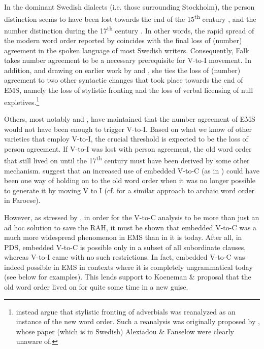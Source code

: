 \documentclass[output=paper]{langscibook}
\begin{document}
In the dominant Swedish dialects (i.e. those surrounding Stockholm), the person distinction seems to have been lost towards the end of the 15\textsuperscript{th} century \citep{Neuman1925}, and the number distinction during the 17\textsuperscript{th} century \citep{Larsson1988}. In other words, the rapid spread of the modern word order reported by \citet{Falk1993} coincides with the final loss of (number) agreement in the spoken language of most Swedish writers. Consequently, Falk takes number agreement to be a necessary prerequisite for V-to-I movement. In addition, and drawing on earlier work by \citet{Platzack1985} and \citet{PlatzackHolmberg1989}, she ties the loss of (number) agreement to two other syntactic changes that took place towards the end of EMS, namely the loss of stylistic fronting and the loss of verbal licensing of null expletives.\footnote{\citet{AlexiadouFanselow2002} instead argue that stylistic fronting of adverbials was reanalyzed as an instance of the new word order. Such a reanalysis was originally proposed by \citet{Pettersson1988}, whose paper (which is in Swedish) Alexiadou \& Fanselow were clearly unaware of.} 



Others, most notably \citet{Rohrbacher1999} and \citet{KoenemanZeijlstra2014}, have maintained that the number agreement of EMS would not have been enough to trigger V-to-I. Based on what we know of other varieties that employ V-to-I, the crucial threshold is expected to be the loss of person agreement. If V-to-I was lost with person agreement, the old word order that still lived on until the 17\textsuperscript{th} century must have been derived by some other mechanism. \citet{KoenemanZeijlstra2014} suggest that an increased use of embedded V-to-C (as in ) could have been one way of holding on to the old word order when it was no longer possible to generate it by moving V to I (cf. \citealt{HeycockEtAl2010} for a similar approach to archaic word order in Faroese).



However, as stressed by \citet{Gartner2019}, in order for the V-to-C analysis to be more than just an ad hoc solution to save the RAH, it must be shown that embedded V-to-C was a much more widespread phenomenon in EMS than in it is today. After all, in PDS, embedded V-to-C is possible only in a subset of all subordinate clauses, whereas V-to-I came with no such restrictions. In fact, embedded V-to-C was indeed possible in EMS in contexts where it is completely ungrammatical today (see  below for examples). This lends support to Koeneman \&  proposal that the old word order lived on for quite some time in a new guise.
\end{document}
